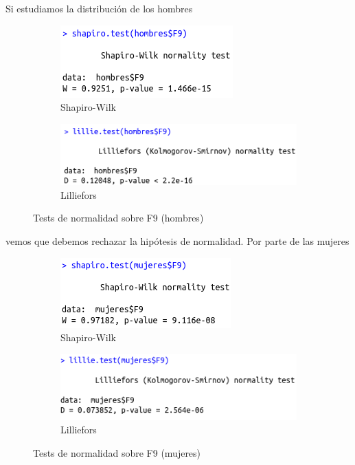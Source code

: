 Si estudiamos la distribución de los hombres

\begin{figure}[H]
	\centering
	\begin{subfigure}{.5\textwidth}
		\centering
		\includegraphics[width=.6\linewidth]{swh-F9.png}
		\caption{Shapiro-Wilk}
		\label{fig:swh-F9}
	\end{subfigure}%
	\begin{subfigure}{.5\textwidth}
		\centering
		\includegraphics[width=.6\linewidth]{lh-F9.png}
		\caption{Lilliefors}
		\label{fig:lh-F9}
	\end{subfigure}
	\caption{Tests de normalidad sobre F9 (hombres)}
	\label{fig:normhF9}
\end{figure}

vemos que debemos rechazar la hipótesis de normalidad. Por parte de las mujeres

\begin{figure}[H]
	\centering
	\begin{subfigure}{.5\textwidth}
		\centering
		\includegraphics[width=.6\linewidth]{swm-F9.png}
		\caption{Shapiro-Wilk}
		\label{fig:swm-F9}
	\end{subfigure}%
	\begin{subfigure}{.5\textwidth}
		\centering
		\includegraphics[width=.6\linewidth]{lm-F9.png}
		\caption{Lilliefors}
		\label{fig:lm-F9}
	\end{subfigure}
	\caption{Tests de normalidad sobre F9 (mujeres)}
	\label{fig:normmF9}
\end{figure}

